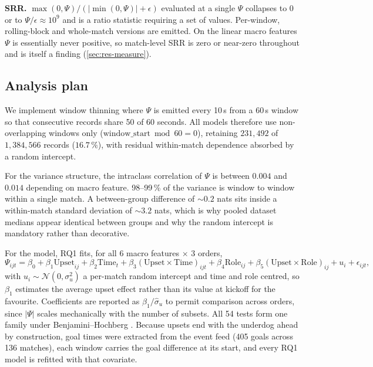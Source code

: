 \documentclass[11pt,a4paper]{article}
\begin{document}
\textbf{SRR.} $\max(0,\Psi)/(|\min(0,\Psi)|+\epsilon)$ evaluated at a single $\Psi$
collapses to $0$ or to $\Psi/\epsilon\approx10^9$ and is a ratio statistic requiring a
set of values. Per-window, rolling-block and whole-match versions are emitted. On
the linear macro features $\Psi$ is essentially never positive, so match-level SRR is
zero or near-zero throughout and is itself a finding (\cref{sec:res-measure}).

\subsection{Analysis plan}
\label{sec:plan}

We implement window thinning where $\Psi$ is emitted every 10\,s from a 60\,s window so
that consecutive records share 50 of 60 seconds. All models therefore use
non-overlapping windows only ($\text{window\_start}\bmod 60=0$), retaining
$231{,}492$ of $1{,}384{,}566$ records ($16.7\,\%$), with residual within-match dependence
absorbed by a random intercept.

For the variance structure, the intraclass correlation of $\Psi$ is between $0.004$
and $0.014$ depending on macro feature. 98--99\,\% of the variance is
window to window within a single match. A
between-group difference of $\sim0.2$ nats sits inside a within-match standard deviation
of $\sim3.2$ nats, which is why pooled dataset medians appear identical between groups and
why the random intercept is mandatory rather than decorative.

For the model, RQ1 fits, for all 6 macro features $\times$ 3 orders,
\begin{equation}
\Psi_{ijt}=\beta_0+\beta_1\text{Upset}_{ij}+\beta_2\text{Time}_t+\beta_3(\text{Upset}\times\text{Time})_{ijt}
+\beta_4\text{Role}_{ij}+\beta_5(\text{Upset}\times\text{Role})_{ij}+u_i+\epsilon_{ijt},
\label{eq:rq1}
\end{equation}
with $u_i\sim\mathcal N(0,\sigma_u^2)$ a per-match random intercept and time and role
centred, so $\beta_1$ estimates the average upset effect rather than its value at kickoff
for the favourite. Coefficients are reported as $\beta_1/\hat\sigma_u$ to permit comparison
across orders, since $|\Psi|$ scales mechanically with the number of subsets. All 54 tests
form one family under Benjamini--Hochberg \cite{benjamini1995}. Because upsets end with the
underdog ahead by construction, goal times were extracted from the event feed (405 goals
across 136 matches), each window carries the goal difference at its start, and every RQ1
model is refitted with that covariate.
\end{document}

